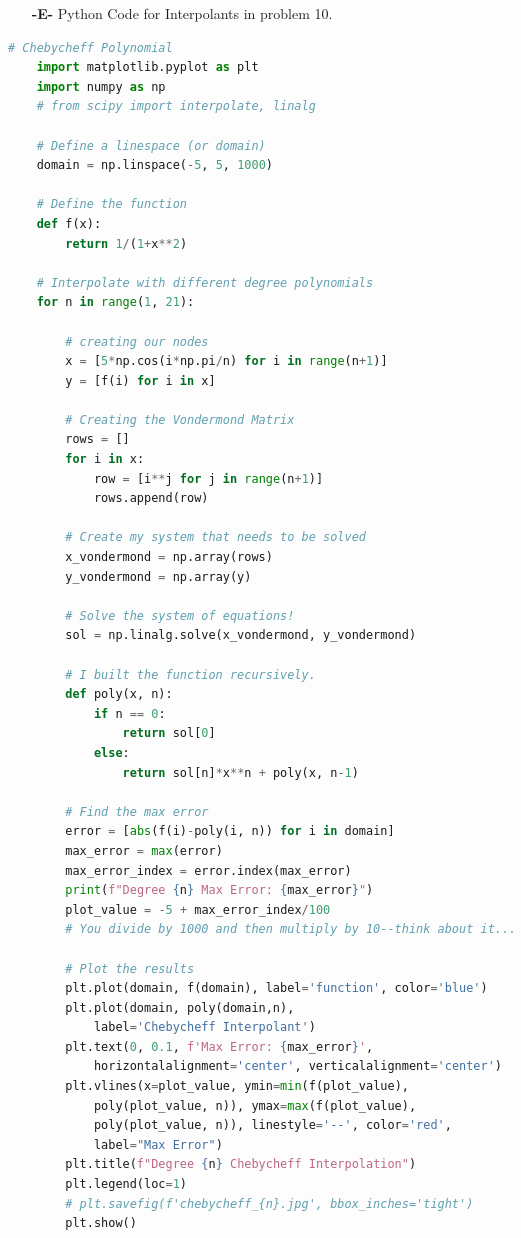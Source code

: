 \documentclass[11pt]{article}
\theoremstyle{definition}
\newcommand{\1}[1]{\mathbf{1} \left \{ #1 \right \}}
\begin{document}
\begin{itemize}
    \item[{\textbf{-E-}}] Python Code for Interpolants in problem 10.
\end{itemize}
\begin{lstlisting}[language=Python]
    # Chebycheff Polynomial
    import matplotlib.pyplot as plt
    import numpy as np
    # from scipy import interpolate, linalg

    # Define a linespace (or domain)
    domain = np.linspace(-5, 5, 1000)

    # Define the function
    def f(x):
        return 1/(1+x**2)

    # Interpolate with different degree polynomials
    for n in range(1, 21):

        # creating our nodes
        x = [5*np.cos(i*np.pi/n) for i in range(n+1)]
        y = [f(i) for i in x]

        # Creating the Vondermond Matrix
        rows = []
        for i in x:
            row = [i**j for j in range(n+1)]
            rows.append(row)

        # Create my system that needs to be solved
        x_vondermond = np.array(rows)
        y_vondermond = np.array(y)

        # Solve the system of equations!
        sol = np.linalg.solve(x_vondermond, y_vondermond)

        # I built the function recursively.
        def poly(x, n):
            if n == 0:
                return sol[0]
            else:
                return sol[n]*x**n + poly(x, n-1)

        # Find the max error
        error = [abs(f(i)-poly(i, n)) for i in domain]
        max_error = max(error)
        max_error_index = error.index(max_error)
        print(f"Degree {n} Max Error: {max_error}")
        plot_value = -5 + max_error_index/100
        # You divide by 1000 and then multiply by 10--think about it...

        # Plot the results
        plt.plot(domain, f(domain), label='function', color='blue')
        plt.plot(domain, poly(domain,n),
            label='Chebycheff Interpolant')
        plt.text(0, 0.1, f'Max Error: {max_error}',
            horizontalalignment='center', verticalalignment='center')
        plt.vlines(x=plot_value, ymin=min(f(plot_value),
            poly(plot_value, n)), ymax=max(f(plot_value),
            poly(plot_value, n)), linestyle='--', color='red',
            label="Max Error")
        plt.title(f"Degree {n} Chebycheff Interpolation")
        plt.legend(loc=1)
        # plt.savefig(f'chebycheff_{n}.jpg', bbox_inches='tight')
        plt.show()
\end{lstlisting}
\end{document}
